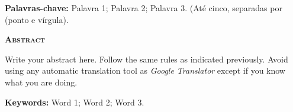 {\vspace*{0.5cm}
\noindent\textbf{Palavras-chave:} Palavra 1; Palavra 2; Palavra 3. (Até cinco, separadas por \q{ ; } (ponto e vírgula).

\newpage
\pagestyle{empty}
\begin{center}
    \textbf{\textsc{Abstract}}
\end{center}
\SingleSpacing\noindent
    Write your abstract here. Follow the same rules as indicated previously. Avoid using any automatic translation tool as \textit{Google Translator} except if you know what you are doing.

\vspace*{0.5cm}
\noindent\textbf{Keywords:} Word 1; Word 2; Word 3.
}
\newpage\tableofcontents*
\thispagestyle{empty}
\newpage\listoffigures*
\thispagestyle{empty}
\newpage\listoftables*
\thispagestyle{empty}